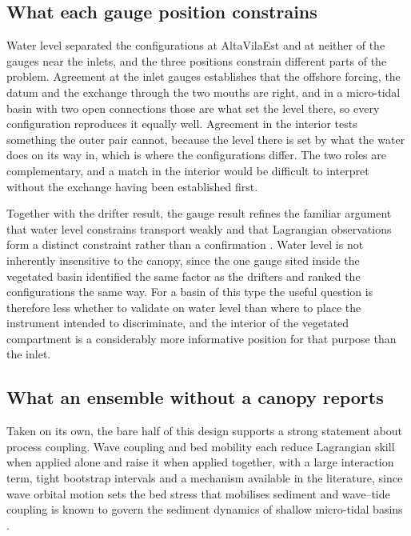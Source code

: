\subsection{What each gauge position constrains}

Water level separated the configurations at AltaVilaEst and at neither of the
gauges near the inlets, and the three positions constrain different parts of the
problem. Agreement at the inlet gauges establishes that the offshore forcing,
the datum and the exchange through the two mouths are right, and in a micro-tidal
basin with two open connections those are what set the level there, so every
configuration reproduces it equally well. Agreement in the interior tests
something the outer pair cannot, because the level there is set by what the
water does on its way in, which is where the configurations differ. The two
roles are complementary, and a match in the interior would be difficult to
interpret without the exchange having been established first.

Together with the drifter result, the gauge result refines the familiar argument that water level
constrains transport weakly and that Lagrangian observations form a distinct
constraint rather than a confirmation \citep{Liu2011, Revelard2021}. Water level
is not inherently insensitive to the canopy, since the one gauge sited inside
the vegetated basin identified the same factor as the drifters and ranked the
configurations the same way. For a basin of this type the useful question is
therefore less whether to validate on water level than where to place the
instrument intended to discriminate, and the interior of the vegetated
compartment is a considerably more informative position for that purpose than
the inlet.

\subsection{What an ensemble without a canopy reports}
\label{sec:disc_synergy}

Taken on its own, the bare half of this design supports a strong statement about
process coupling. Wave coupling and bed mobility each reduce Lagrangian skill
when applied alone and raise it when applied together, with a large interaction
term, tight bootstrap intervals and a mechanism available in the literature,
since wave orbital motion sets the bed stress that mobilises sediment and
wave--tide coupling is known to govern the sediment dynamics of shallow
micro-tidal basins \citep{Carniello2011}.


